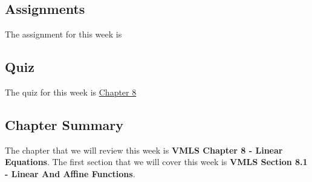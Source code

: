 \subsection{Assignments}

The assignment for this week is   

\subsection{Quiz}

The quiz for this week is \href{https://applied.cs.colorado.edu/mod/quiz/view.php?id=50764}{Chapter 8} \textbullet {}  

\subsection{Chapter Summary}

The chapter that we will review this week is \textbf{VMLS Chapter 8 - Linear Equations}. The first section that we will cover this week is \textbf{VMLS Section 8.1 - Linear And Affine Functions}.

